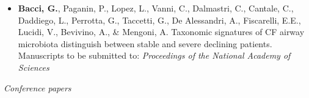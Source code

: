 \begin{itemize}


\item \textbf{Bacci, G.}, Paganin, P., Lopez, L., Vanni, C., Dalmastri, C., Cantale, C., Daddiego, L., Perrotta, G., Taccetti, G., De Alessandri, A., Fiscarelli, E.E., Lucidi, V., Bevivino, A., \& Mengoni, A. Taxonomic signatures of CF airway microbiota distinguish between stable and severe declining patients. Manuscripts to be  submitted to: \textit{Proceedings of the National Academy of Sciences}


\end{itemize}


\textit{Conference papers}

